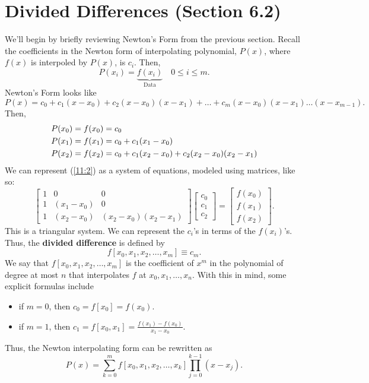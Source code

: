 \documentclass[letterpaper]{article}
\begin{document}
\section{Divided Differences (Section 6.2)}
We'll begin by briefly reviewing Newton's Form from the previous section. Recall the coefficients in the Newton form of interpolating polynomial, $P(x)$, where $f(x)$ is interpoled by $P(x)$, is $c_i$. Then, 
\[P(x_i) = \underbrace{f(x_i)}_{\text{Data}} \quad 0 \leq i \leq m.\]
Newton's Form looks like  
\[P(x) = c_0 + c_1 (x - x_0) + c_2 (x - x_0) (x - x_1) + \hdots + c_m (x - x_0) (x - x_1) \hdots (x - x_{m - 1}).\]
Then, 
\begin{equation}{\label{11:2}}
    \begin{aligned}
        P(x_0) &= f(x_0) = c_0 \\ 
        P(x_1) &= f(x_1) = c_0 + c_1 (x_1 - x_0) \\ 
        P(x_2) &= f(x_2) = c_0 + c_1 (x_2 - x_0) + c_2 (x_2 - x_0) (x_2 - x_1)
    \end{aligned}
\end{equation}
We can represent (\ref{11:2}) as a system of equations, modeled using matrices, like so: 
\[
    \begin{bmatrix}
        1 & 0 & 0 \\ 
        1 & (x_1 - x_0) & 0 \\  
        1 & (x_2 - x_0) & (x_2 - x_0)(x_2 - x_1)
    \end{bmatrix} \begin{bmatrix}
        c_0 \\ c_1 \\ c_2 
    \end{bmatrix} = \begin{bmatrix}
        f(x_0) \\ 
        f(x_1) \\ 
        f(x_2)
    \end{bmatrix}.
\]
This is a triangular system. We can represent the $c_i$'s in terms of the $f(x_i)$'s. Thus, the \textbf{divided difference} is defined by
\begin{equation}
    f[x_0, x_1, x_2, \hdots, x_m] \equiv c_m.
\end{equation}
We say that $f[x_0, x_1, x_2, \hdots, x_m]$ is the coefficient of $x^m$ in the polynomial of degree at most $n$ that interpolates $f$ at $x_0, x_1, \hdots, x_n$. With this in mind, some explicit formulas include 
\begin{itemize}
    \item if $m = 0$, then $c_0 = f[x_0] = f(x_0)$. 
    \item if $m = 1$, then $c_1 = f[x_0, x_1] = \frac{f(x_1) - f(x_0)}{x_1 - x_0}$.
\end{itemize}
Thus, the Newton interpolating form can be rewritten as 
\[P(x) = \sum_{k = 0}^{m} f[x_0, x_1, x_2, \hdots, x_k] \prod_{j = 0}^{k - 1} (x - x_j).\]
\end{document}
